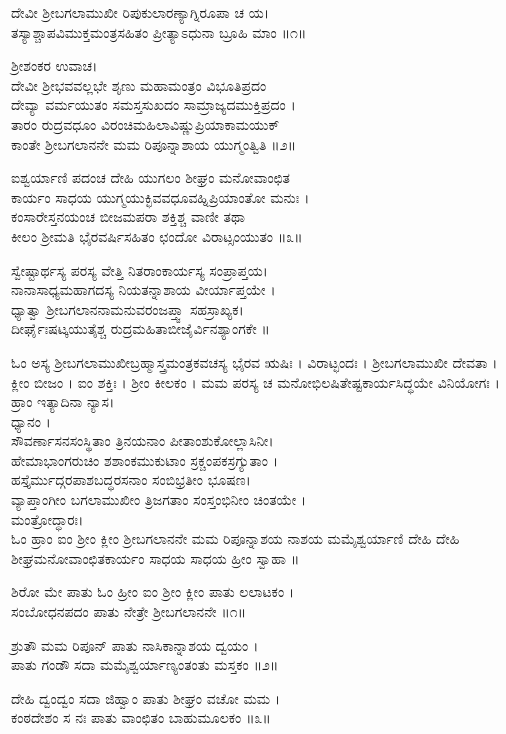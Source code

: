 ದೇವೀ ಶ್ರೀಬಗಲಾಮುಖೀ ರಿಪುಕುಲಾರಣ್ಯಾಗ್ನಿರೂಪಾ ಚ ಯ।\\
ತಸ್ಯಾಶ್ಚಾಪವಿಮುಕ್ತಮಂತ್ರಸಹಿತಂ ಪ್ರೀತ್ಯಾಽಧುನಾ ಬ್ರೂಹಿ ಮಾಂ ॥೧॥

ಶ್ರೀಶಂಕರ ಉವಾಚ।\\
ದೇವೀ ಶ್ರೀಭವವಲ್ಲಭೇ ಶೃಣು ಮಹಾಮಂತ್ರಂ ವಿಭೂತಿಪ್ರದಂ\\
ದೇವ್ಯಾ ವರ್ಮಯುತಂ ಸಮಸ್ತಸುಖದಂ ಸಾಮ್ರಾಜ್ಯದಮುಕ್ತಿಪ್ರದಂ ।\\
ತಾರಂ ರುದ್ರವಧೂಂ ವಿರಂಚಿಮಹಿಲಾವಿಷ್ಣುಪ್ರಿಯಾಕಾಮಯುಕ್\\
ಕಾಂತೇ ಶ್ರೀಬಗಲಾನನೇ ಮಮ ರಿಪೂನ್ನಾಶಾಯ ಯುಗ್ಮಂತ್ವಿತಿ ॥೨॥

ಐಶ್ವರ್ಯಾಣಿ ಪದಂಚ ದೇಹಿ ಯುಗಲಂ ಶೀಘ್ರಂ ಮನೋವಾಂಛಿತ\\
ಕಾರ್ಯಂ ಸಾಧಯ ಯುಗ್ಮಯುಕ್ಛಿವವಧೂವಹ್ನಿಪ್ರಿಯಾಂತೋ ಮನುಃ ।\\
ಕಂಸಾರೇಸ್ತನಯಂಚ ಬೀಜಮಪರಾ ಶಕ್ತಿಶ್ಚ ವಾಣೀ ತಥಾ\\
ಕೀಲಂ ಶ್ರೀಮತಿ ಭೈರವರ್ಷಿಸಹಿತಂ ಛಂದೋ ವಿರಾಟ್ಸಂಯುತಂ ॥೩॥

ಸ್ವೇಷ್ಟಾರ್ಥಸ್ಯ ಪರಸ್ಯ ವೇತ್ತಿ ನಿತರಾಂಕಾರ್ಯಸ್ಯ ಸಂಪ್ರಾಪ್ತಯ।\\
ನಾನಾಸಾಧ್ಯಮಹಾಗದಸ್ಯ ನಿಯತನ್ನಾಶಾಯ ವೀರ್ಯಾಪ್ತಯೇ ।\\
ಧ್ಯಾತ್ವಾ ಶ್ರೀಬಗಲಾನನಾಮನುವರಂಜಪ್ತ್ವಾ ಸಹಸ್ರಾಖ್ಯಕ।\\
ದೀರ್ಘೈಃಷಟ್ಕಯುತೈಶ್ಚ ರುದ್ರಮಹಿತಾಬೀಜೈರ್ವಿನಶ್ಯಾಂಗಕೇ ॥

ಓಂ ಅಸ್ಯ ಶ್ರೀಬಗಲಾಮುಖೀಬ್ರಹ್ಮಾಸ್ತ್ರಮಂತ್ರಕವಚಸ್ಯ ಭೈರವ ಋಷಿಃ । ವಿರಾಟ್ಛಂದಃ । ಶ್ರೀಬಗಲಾಮುಖೀ ದೇವತಾ । ಕ್ಲೀಂ ಬೀಜಂ । ಐಂ ಶಕ್ತಿಃ । ಶ್ರೀಂ ಕೀಲಕಂ । ಮಮ ಪರಸ್ಯ ಚ ಮನೋಭಿಲಷಿತೇಷ್ಟಕಾರ್ಯಸಿದ್ಧಯೇ ವಿನಿಯೋಗಃ ।\\
ಹ್ರಾಂ ಇತ್ಯಾದಿನಾ ನ್ಯಾಸ।\\
ಧ್ಯಾನಂ ।\\
ಸೌವರ್ಣಾಸನಸಂಸ್ಥಿತಾಂ ತ್ರಿನಯನಾಂ ಪೀತಾಂಶುಕೋಲ್ಲಾಸಿನೀ।\\
ಹೇಮಾಭಾಂಗರುಚಿಂ ಶಶಾಂಕಮುಕುಟಾಂ ಸ್ರಕ್ಚಂಪಕಸ್ರಗ್ಯುತಾಂ ।\\
ಹಸ್ತೈರ್ಮುದ್ಗರಪಾಶಬದ್ಧರಸನಾಂ ಸಂಬಿಭ್ರತೀಂ ಭೂಷಣ।\\
ವ್ಯಾಪ್ತಾಂಗೀಂ ಬಗಲಾಮುಖೀಂ ತ್ರಿಜಗತಾಂ ಸಂಸ್ತಂಭಿನೀಂ ಚಿಂತಯೇ ।\\
ಮಂತ್ರೋದ್ಧಾರಃ।\\
ಓಂ ಹ್ರಾಂ ಐಂ ಶ್ರೀಂ ಕ್ಲೀಂ ಶ್ರೀಬಗಲಾನನೇ ಮಮ ರಿಪೂನ್ನಾಶಯ ನಾಶಯ ಮಮೈಶ್ವರ್ಯಾಣಿ ದೇಹಿ ದೇಹಿ ಶೀಘ್ರಮನೋವಾಂಛಿತಕಾರ್ಯಂ ಸಾಧಯ ಸಾಧಯ ಹ್ರೀಂ ಸ್ವಾಹಾ ॥

ಶಿರೋ ಮೇ ಪಾತು ಓಂ ಹ್ರೀಂ ಐಂ ಶ್ರೀಂ ಕ್ಲೀಂ ಪಾತು ಲಲಾಟಕಂ ।\\
ಸಂಬೋಧನಪದಂ ಪಾತು ನೇತ್ರೇ ಶ್ರೀಬಗಲಾನನೇ ॥೧॥

ಶ್ರುತೌ ಮಮ ರಿಪೂನ್ ಪಾತು ನಾಸಿಕಾನ್ನಾಶಯ ದ್ವಯಂ ।\\
ಪಾತು ಗಂಡೌ ಸದಾ ಮಮೈಶ್ವರ್ಯಾಣ್ಯಂತಂತು ಮಸ್ತಕಂ ॥೨॥

ದೇಹಿ ದ್ವಂದ್ವಂ ಸದಾ ಜಿಹ್ವಾಂ ಪಾತು ಶೀಘ್ರಂ ವಚೋ ಮಮ ।\\
ಕಂಠದೇಶಂ ಸ ನಃ ಪಾತು ವಾಂಛಿತಂ ಬಾಹುಮೂಲಕಂ ॥೩॥

